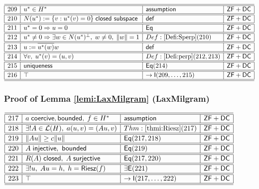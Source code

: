 \documentclass[11pt,reqno]{amsart}
\begin{document}
\noindent$%
\begin{array}{|r|l|l|l|}
\hline\hline
209 & u^{*}\in H^{*} & \mathsf{assumption} & \mathsf{ZF+DC} \\ \hline\hline
210 & N(u^{*}):=\{v:u^{*}(v)=0\}\;\mathsf{closed\ subspace} & \mathsf{def} & \mathsf{ZF+DC} \\ \hline\hline
211 & u^{*}=0\Rightarrow u=0 & \mathsf{Eq} & \mathsf{ZF+DC} \\ \hline\hline
212 & u^{*}\neq0\Rightarrow\exists w\in N(u^{*})^{\perp},\;w\neq0,\;\|w\|=1 & Def:\ref{Defi:Sperp}(210) & \mathsf{ZF+DC} \\ \hline\hline
213 & u:=\overline{u^{*}(w)}w & \mathsf{def} & \mathsf{ZF+DC} \\ \hline\hline
214 & \forall v,\;u^{*}(v)=(u,v) & Def:\ref{Defi:perp}(212,213) & \mathsf{ZF+DC} \\ \hline\hline
215 & \mathsf{uniqueness} & \mathsf{Eq}(214) & \mathsf{ZF+DC} \\ \hline\hline
216 & \top & \to\mathsf{I}(209,\dots,215) & \mathsf{ZF+DC} \\ \hline\hline
\end{array}%
$

\medskip

\subsubsection*{Proof of Lemma \ref{lemi:LaxMilgram} (\textsf{LaxMilgram})}

\noindent$%
\begin{array}{|r|l|l|l|}
\hline\hline
217 & a\;\mathsf{coercive,bounded},\;f\in H^{*} & \mathsf{assumption} & \mathsf{ZF+DC} \\ \hline\hline
218 & \exists!A\in\mathcal{L}(H),\;a(u,v)=(Au,v) & Thm:\ref{thmi:Riesz}(217) & \mathsf{ZF+DC} \\ \hline\hline
219 & \|Au\|\ge c\|u\| & \mathsf{Eq}(217,218) & \mathsf{ZF+DC} \\ \hline\hline
220 & A\;\mathsf{injective,\ bounded} & \mathsf{Eq}(219) & \mathsf{ZF+DC} \\ \hline\hline
221 & R(A)\;\mathsf{closed},\;A\;\mathsf{surjective} & \mathsf{Eq}(217,220) & \mathsf{ZF+DC} \\ \hline\hline
222 & \exists!u,\;Au=h,\;h=\mathsf{Riesz}(f) & \exists\mathsf{E}(221) & \mathsf{ZF+DC} \\ \hline\hline
223 & \top & \to\mathsf{I}(217,\dots,222) & \mathsf{ZF+DC} \\ \hline\hline
\end{array}%
$
\end{document}
